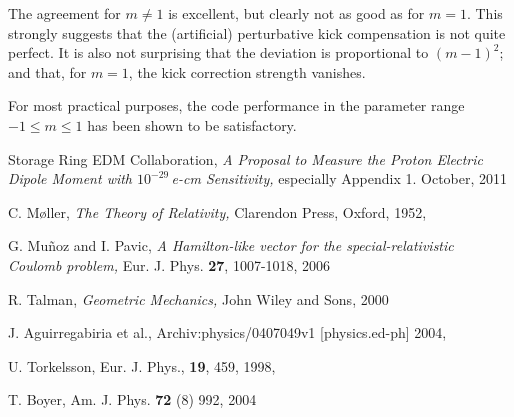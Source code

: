 \documentclass[12pt]{article}
\begin{document}
The agreement for $m\ne1$ is excellent, but clearly not as good as for $m=1$. This strongly suggests that the 
(artificial) perturbative kick compensation is not quite perfect. It is also not surprising that the deviation 
is proportional to $(m-1)^2$; and that, for $m=1$, the kick correction strength vanishes.

For most practical purposes, the code performance in the parameter range $-1\le m\le 1$ has been shown to 
be satisfactory. 
\clearpage





\begin{thebibliography}{99}
Storage Ring EDM Collaboration, \emph{A Proposal to Measure the
Proton Electric Dipole Moment with $10^{-29}\,$e-cm Sensitivity,}
especially Appendix 1. October, 2011

C. M\o ller, \emph{The Theory of Relativity,} Clarendon Press,
Oxford, 1952, 

G. Mu\~{n}oz and I. Pavic, \emph{A Hamilton-like vector for
the special-relativistic Coulomb problem,} 
Eur. J. Phys. {\bf 27}, 1007-1018, 2006

R. Talman, \emph{Geometric Mechanics,} John Wiley and Sons, 2000

J. Aguirregabiria et al., 
Archiv:physics/0407049v1 [physics.ed-ph] 2004, 

U. Torkelsson, Eur. J. Phys., {\bf 19}, 459, 1998, 

T. Boyer, Am. J. Phys. {\bf 72} (8) 992, 2004

\end{thebibliography}
\end{document}
